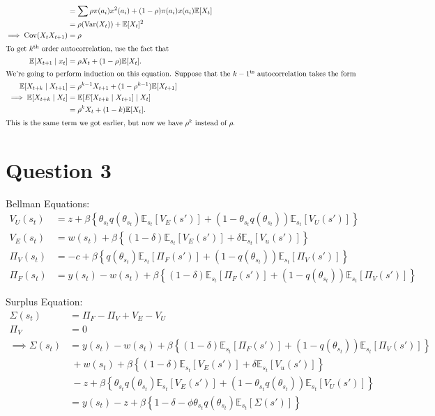 \documentclass[11pt]{article}
\newcommand{\E}{\mathbb{E}}
\newcommand{\st}{_{s_t}}
\newcommand{\var}{\operatorname{Var}}
\newcommand{\cov}{\operatorname{Cov}}
\begin{document}
\begin{enumerate}[label=\alph*)]
\begin{align*}
&= \sum \rho \pi(a_i)x^2(a_i) + (1- \rho) \pi(a_i) x(a_i) \E[X_t]\\
&= \rho(\var(X_t)) + \E[X_t]^2\\
\implies \cov(X_t X_{t + 1}) &= \rho\\
\intertext{To get $k^{\text{th}}$ order autocorrelation, use the fact that}
\E[X_{t + 1} \mid x_t] &= \rho X_t + (1 - \rho) \E[X_t].\\
\intertext{We're going to perform induction on this equation. Suppose that the $k - 1^{\text{ts}}$ autocorrelation takes the form}
\E[X_{t + k} \mid X_{t + 1}] &= \rho^{k - 1} X_{t + 1} + (1 - \rho^{k - 1})\E[X_{t + 1}]\\
\implies \E[X_{t + k} \mid X_t] &= \E[E[X_{t + k} \mid X_{t + 1}]\mid X_t]\\
&= \rho^k X_t + (1 - k) \E [X_t].\\
\intertext{This is the same term we got earlier, but now we have $\rho^k$ instead of $\rho$.}
\end{align*}
\end{enumerate}
\newpage

\section{Question 3}
\label{sec:org4e86124}

Bellman Equations:
\begin{align*}
V_U(s_t) &= z + \beta \left\{\theta\st q(\theta\st)\E\st [V_E(s')] + (1 - \theta\st q (\theta\st)) \E\st [V_U(s')]\right\}\\
V_E(s_t) &= w(s_t) + \beta \left\{(1 - \delta) \E\st [V_E(s')] + \delta \E\st [V_u(s')]\right\}\\
\Pi_V(s_t) &= -c + \beta \left\{ q(\theta\st)\E\st [\Pi_F(s')] + (1 - q(\theta\st)) \E\st[\Pi_V (s')]\right\}\\
\Pi_F(s_t) &= y(s_t) - w(s_t) + \beta \left\{ (1 - \delta) \E\st [\Pi_F(s')]+ (1 - q(\theta\st)) \E\st[\Pi_V (s')]\right\}
\end{align*}

Surplus Equation:
\begin{align*}
\Sigma(s_t) &= \Pi_F - \Pi_V + V_E - V_U\\
\Pi_V &= 0\tag{free entry}\\
\implies \Sigma(s_t)
&=
y(s_t) - w(s_t) + \beta \left\{ (1 - \delta) \E\st [\Pi_F(s')]+ (1 - q(\theta\st)) \E\st[\Pi_V (s')]\right\}\\
&\ +w(s_t) + \beta \left\{(1 - \delta) \E\st [V_E(s')] + \delta \E\st [V_u(s')]\right\}\\
&\ - z + \beta \left\{\theta\st q(\theta\st)\E\st [V_E(s')] + (1 - \theta\st q (\theta\st)) \E\st [V_U(s')]\right\}\\
&= y(s_t) -z + \beta\left\{1 - \delta - \phi \theta\st q(\theta\st)\E\st[\Sigma(s')]\right\}
\end{align*}
\end{document}
